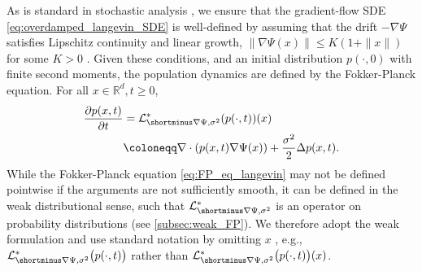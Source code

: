 \documentclass[twoside]{article}
\newcommand{\R} {\mathbb R}
\begin{document}
As is standard in stochastic analysis \citep{shen2025multi, berlinghieri2025oh}, we ensure that the gradient-flow SDE \eqref{eq:overdamped_langevin_SDE} is well-defined by assuming that the drift $-\nabla \Psi$ satisfies Lipschitz continuity and linear growth, $\|\nabla \Psi(x)\| \le K(1+\|x\|)$ for some $K>0$ \citep[Theorem 5.5]{oksendal2013stochastic}. 
Given these conditions, and an initial distribution $p(\cdot,0)$ with finite second moments,
the population dynamics are defined by the Fokker-Planck equation. For all $x \in \R^d, t \ge 0$,
\begin{align}
\begin{split}
    \frac{\partial p(x, t)}{\partial t}
    &=
    \mathcal{L}^*_{\shortminus\nabla\Psi, \sigma^2}(p(\cdot,t))(x)\\
    &\coloneqq 
    \nabla \cdot (p(x, t) \nabla \Psi(x)) + \frac{\sigma^2}{2} \Delta p(x, t).
    \label{eq:FP_eq_langevin}
    \end{split}
\end{align} 
While the Fokker-Planck equation \eqref{eq:FP_eq_langevin} may not be defined pointwise if the arguments are not sufficiently smooth, it can be defined in the weak distributional sense, such that $\mathcal{L}^*_{\shortminus\nabla\Psi, \sigma^2}$ is an operator on probability distributions (see \cref{subsec:weak_FP}). We therefore adopt the weak formulation and use standard notation by omitting $x$ \citep{bogachev2022fokker}, e.g., $\mathcal{L}^*_{\shortminus\nabla\Psi, \sigma^2}\bigl(p(\cdot,t)\bigr)$ rather than $\mathcal{L}^*_{\shortminus\nabla\Psi, \sigma^2}\bigl(p(\cdot,t)\bigr)(x)$.

\end{document}
